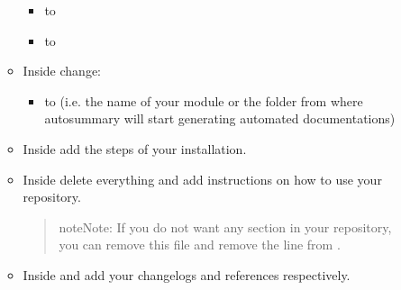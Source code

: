 \documentclass[letterpaper,10pt,english]{sphinxmanual}
\begin{document}
\begin{itemize}
\begin{description}
\begin{itemize}
\begin{itemize}
\item {} 
\sphinxAtStartPar
{} to 

\item {} 
\sphinxAtStartPar
{} to 

\end{itemize}

\item {} 
\sphinxAtStartPar
Inside  change:
\begin{itemize}
\item {} 
\sphinxAtStartPar
{} to  (i.e. the name of your module or the folder from where autosummary will start generating automated documentations)

\end{itemize}

\item {} 
\sphinxAtStartPar
Inside  add the steps of your installation.

\item {} 
\sphinxAtStartPar
Inside  delete everything and add instructions on how to use your repository.
\begin{quote}

\begin{sphinxadmonition}{note}{Note:}
\sphinxAtStartPar
If you do not want any  section in your repository, you can remove this  file and remove the line  from .
\end{sphinxadmonition}
\end{quote}

\item {} 
\sphinxAtStartPar
Inside  and  add your changelogs and references respectively.

\end{itemize}

\end{description}


\end{itemize}
\end{document}
